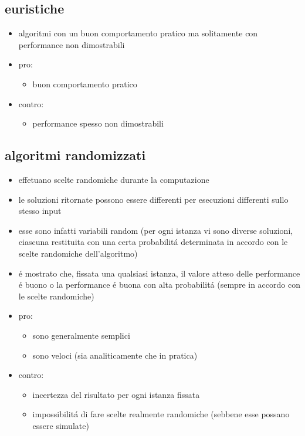 
\subsection*{euristiche}
\begin{flushleft}
	\begin{itemize}
		\item algoritmi con un buon comportamento pratico ma solitamente con performance non dimostrabili
		\item pro:
		\begin{itemize}
			\item buon comportamento pratico
		\end{itemize}
		\item contro:
		\begin{itemize}
			\item performance spesso non dimostrabili
		\end{itemize}
	\end{itemize}
\end{flushleft}


\subsection*{algoritmi randomizzati}
\begin{flushleft}
	\begin{itemize}
		\item effetuano scelte randomiche durante la computazione
		\item le soluzioni ritornate possono essere differenti per esecuzioni differenti sullo stesso input
		\item esse sono infatti variabili random (per ogni istanza vi sono diverse soluzioni, ciascuna restituita con una certa probabilit\'a determinata in accordo con le scelte randomiche dell'algoritmo)
		\item \'e mostrato che, fissata una qualsiasi istanza, il valore atteso delle performance \'e buono o la performance \'e buona con alta probabilit\'a (sempre in accordo con le scelte randomiche)
		\item pro:
		\begin{itemize}
			\item sono generalmente semplici
			\item sono veloci (sia analiticamente che in pratica)
		\end{itemize}
		\item contro:
		\begin{itemize}
			\item incertezza del risultato per ogni istanza fissata
			\item impossibilit\'a di fare scelte realmente randomiche (sebbene esse possano essere simulate)
		\end{itemize}
	\end{itemize}
\end{flushleft}

